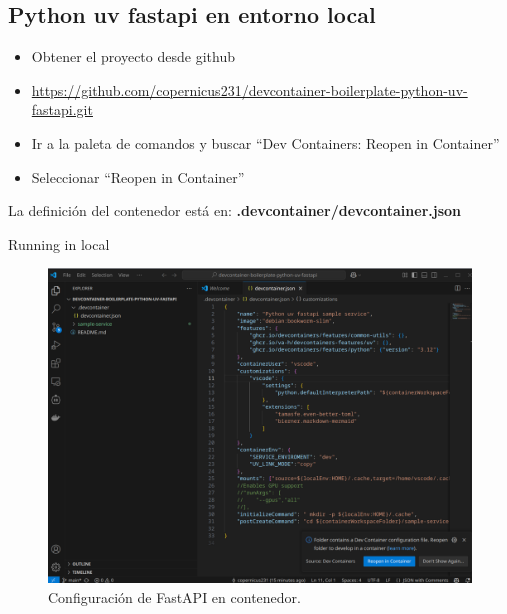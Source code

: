 \documentclass{beamer}
\begin{document}
\subsection{Python uv fastapi en entorno local}
\begin{frame}{\subsecname}
  \begin{itemize}
        \item Obtener el proyecto desde github
        \item \href{https://github.com/copernicus231/devcontainer-boilerplate-python-uv-fastapi.git}{https://github.com/copernicus231/devcontainer-boilerplate-python-uv-fastapi.git}
        \item Ir a la paleta de comandos y buscar  “Dev Containers: Reopen in Container”
        \item Seleccionar “Reopen in Container”
  \end{itemize}
  La definición del contenedor está en: \textbf{.devcontainer/devcontainer.json}
\end{frame}

\begin{frame}{Running in local}
  \begin{figure}
    \centering
    \includegraphics[width=\textwidth]{images/open-container.png}
    \caption{Configuración de FastAPI en contenedor.}
  \end{figure}
\end{frame}
\end{document}

